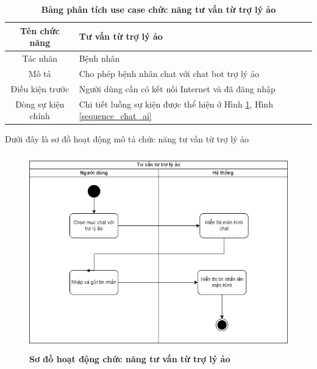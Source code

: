   \begin{table}[H]
    \caption{\bfseries \fontsize{12pt}{0pt}\selectfont Bảng phân tích use case chức năng tư vấn từ trợ lý ảo}
    \centering
    \begin{tabularx}{0.9\textwidth}{|c|X|}
      \hline
      \textbf{Tên chức năng} & \textbf{Tư vấn từ trợ lý ảo} \\
      \hline
      Tác nhân & Bệnh nhân \\
      \hline
      Mô tả & Cho phép bệnh nhân chat với chat bot trợ lý ảo \\
      \hline
      Điều kiện trước & Người dùng cần có kết nối Internet và đã đăng nhập \\
      \hline
      Dòng sự kiện chính & 
        Chi tiết luồng sự kiện được thể hiện ở Hình \ref{activity_chat_ai}, Hình \ref{sequence_chat_ai} 
        \\
      \hline
    \end{tabularx}
  \end{table}  
  Dưới đây là sơ đồ hoạt động mô tả chức năng tư vấn từ trợ lý ảo
  \begin{figure}[H]
    \centering
    \includegraphics[width=11.5cm,height=8.5cm]{Images/acitivity/activity_chat_ai.png}
    \caption[Sơ đồ hoạt động chức năng tư vấn từ trợ lý ảo]{\bfseries \fontsize{12pt}{0pt}
    \selectfont Sơ đồ hoạt động chức năng tư vấn từ trợ lý ảo}
    \label{activity_chat_ai} %
  \end{figure}

